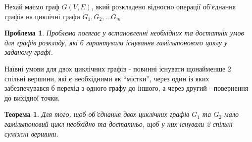\documentclass[a4paper,14pt,ukrainian]{extarticle}
\newtheorem{problem}{Проблема}
\newtheorem{theorem}{Теорема}
\begin{document}
    Нехай маємо граф $G(V,E)$, який розкладено відносно операції об’єднання графів на циклічні графи $G_1, G_2, \dots G_m$.
    \begin{problem}
        Проблема полягає у встановленні необхідних та достатніх умов для графів розкладу, які б гарантували існування гамільтонового циклу у заданому графі.
    \end{problem}
    Наївні умови для двох циклічних графів - повинні існувати щонайменше 2 спільні вершини, які є необхідними як ``містки'', через один із яких забезпечувався б перехід з одного графу до іншого, а через другий - повернення до вихідної точки.
    \begin{theorem}
        Для того, щоб об’єднання двох циклічних графів $G_1$ та $G_2$ мало гамільтоновий цикл необхідно та достатньо, щоб у них існували 2 спільні суміжні вершини.
    \end{theorem}
\end{document}
